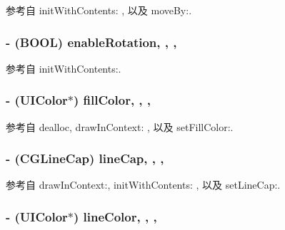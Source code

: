 参考自 init\-With\-Contents\-: , 以及 move\-By\-:.

\hypertarget{interface_r_m_path_a2ee8138aeba736c62e3025c1d4d6cfde}{
\subsubsection[{enable\-Rotation}]{\setlength{\rightskip}{0pt plus 5cm}-\/ (B\-O\-O\-L) enable\-Rotation\hspace{0.3cm}{\ttfamily [read]}, {\ttfamily [write]}, {\ttfamily [atomic]}, {\ttfamily [assign]}}}\label{interface_r_m_path_a2ee8138aeba736c62e3025c1d4d6cfde}


参考自 init\-With\-Contents\-:.

\hypertarget{interface_r_m_path_a24c78845b1cad7d0a707719958a6999e}{
\subsubsection[{fill\-Color}]{\setlength{\rightskip}{0pt plus 5cm}-\/ (U\-I\-Color$\ast$) fill\-Color\hspace{0.3cm}{\ttfamily [read]}, {\ttfamily [write]}, {\ttfamily [nonatomic]}, {\ttfamily [assign]}}}\label{interface_r_m_path_a24c78845b1cad7d0a707719958a6999e}


参考自 dealloc, draw\-In\-Context\-: , 以及 set\-Fill\-Color\-:.

\hypertarget{interface_r_m_path_af0b6eebd8bc03615b3ac8981d05eabef}{
\subsubsection[{line\-Cap}]{\setlength{\rightskip}{0pt plus 5cm}-\/ (C\-G\-Line\-Cap) line\-Cap\hspace{0.3cm}{\ttfamily [read]}, {\ttfamily [write]}, {\ttfamily [nonatomic]}, {\ttfamily [assign]}}}\label{interface_r_m_path_af0b6eebd8bc03615b3ac8981d05eabef}


参考自 draw\-In\-Context\-:, init\-With\-Contents\-: , 以及 set\-Line\-Cap\-:.

\hypertarget{interface_r_m_path_ae8b3e91ec89a67481bead38e350e57d7}{
\subsubsection[{line\-Color}]{\setlength{\rightskip}{0pt plus 5cm}-\/ (U\-I\-Color$\ast$) line\-Color\hspace{0.3cm}{\ttfamily [read]}, {\ttfamily [write]}, {\ttfamily [nonatomic]}, {\ttfamily [assign]}}}\label{interface_r_m_path_ae8b3e91ec89a67481bead38e350e57d7}


